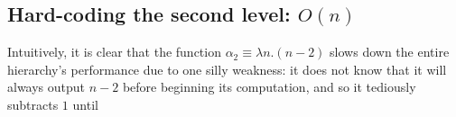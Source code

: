 
\subsection{Hard-coding the second level: $O(n)$} \label{sect: hardcode-lvl2}

Intuitively, it is clear that the function $\alpha_2 \equiv \lambda n.(n-2)$
slows down the entire hierarchy's performance due to one silly weakness:
it does not know that it will always output $n-2$ before beginning its computation,
and so it tediously subtracts $1$ until 

